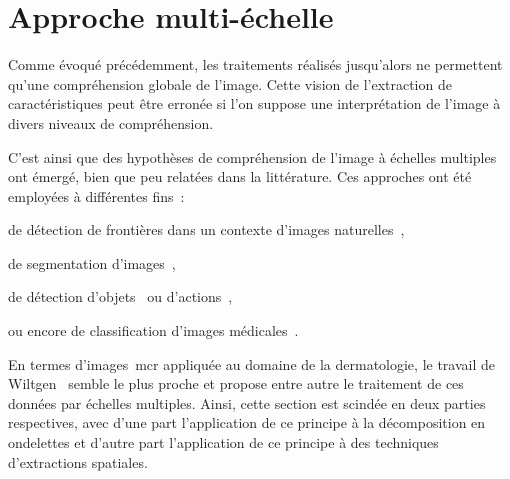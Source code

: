 \section{Approche multi-échelle}
Comme évoqué précédemment, les traitements réalisés jusqu'alors ne permettent qu'une compréhension globale de l'image. Cette vision de l'extraction de caractéristiques peut être erronée si l'on suppose une interprétation de l'image à divers niveaux de compréhension.\par

C'est ainsi que des hypothèses de compréhension de l'image à échelles multiples ont émergé, bien que peu relatées dans la littérature. Ces approches ont été employées à différentes fins~:
\begin{inlinerate}
    \item de détection de frontières dans un contexte d'images naturelles~\cite{Ren2008},
    \item de segmentation d'images~\cite{DosSantos2012,Arbelaez2014},
    \item de détection d'objets~\cite{Felzenszwalb2008} ou d'actions~\cite{Pedersoli2011},
    \item ou encore de classification d'images médicales~\cite{Alsaih2016,Tang2017}.
\end{inlinerate} En termes d'images~\gls{mcr} appliquée au domaine de la dermatologie, le travail de Wiltgen~ semble le plus proche et propose entre autre le traitement de ces données par échelles multiples. Ainsi, cette section est scindée en deux parties respectives, avec d'une part l'application de ce principe à la décomposition en ondelettes et d'autre part l'application de ce principe à des techniques d'extractions spatiales.\par 

